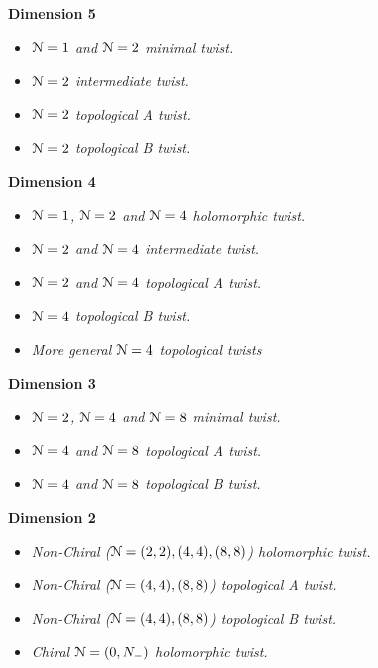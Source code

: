 \documentclass[10pt, oneside]{article}
\begin{document}
\textbf{Dimension 5}
\begin{itemize}
 \item \emph{$\mathcal{N}=1$ and $\mathcal{N}=2$ minimal twist.} \cite{KallenZabzine}
 \item \emph{$\mathcal{N}=2$ intermediate twist.} \cite{ElliottPestun}
 \item \emph{$\mathcal{N}=2$ topological A twist.} \cite{Anderson, QiuZabzine}
 \item \emph{$\mathcal{N}=2$ topological B twist.} \cite{GeyerMuelsch, BakGustavsson1,BakGustavsson2}
\end{itemize}

\textbf{Dimension 4}
\begin{itemize}
 \item \emph{$\mathcal{N}=1$, $\mathcal{N}=2$ and $\mathcal{N}=4$ holomorphic twist.} 
 \item \emph{$\mathcal{N}=2$ and $\mathcal{N}=4$ intermediate twist.}
 \item \emph{$\mathcal{N}=2$ and $\mathcal{N}=4$ topological A twist.}
 \item \emph{$\mathcal{N}=4$ topological B twist.}
 \item \emph{More general $\mathcal{N}=4$ topological twists}
\end{itemize}

\textbf{Dimension 3}
\begin{itemize}
 \item \emph{$\mathcal{N}=2$, $\mathcal{N}=4$ and $\mathcal{N}=8$ minimal twist.} 
 \item \emph{$\mathcal{N}=4$ and $\mathcal{N}=8$ topological A twist.}
 \item \emph{$\mathcal{N}=4$ and $\mathcal{N}=8$ topological B twist.}
\end{itemize}

\textbf{Dimension 2}
\begin{itemize}
 \item \emph{Non-Chiral ($\mathcal{N}=(2,2), (4,4), (8,8)$) holomorphic twist.}
 \item \emph{Non-Chiral ($\mathcal{N}=(4,4), (8,8)$) topological A twist.}
 \item \emph{Non-Chiral ($\mathcal{N}=(4,4), (8,8)$) topological B twist.}
 \item \emph{Chiral $\mathcal{N}=(0,N_-)$ holomorphic twist.}
\end{itemize}
\end{document}
